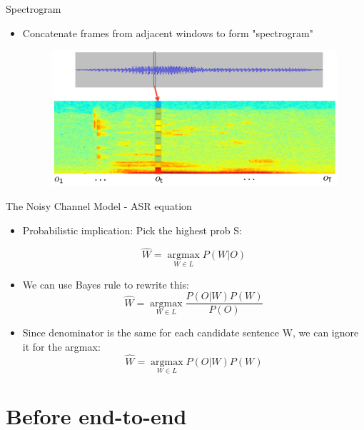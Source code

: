 \documentclass[10pt]{beamer}
\begin{document}
\begin{frame}[fragile]{Spectrogram}
\begin{itemize}
\item Concatenate frames from adjacent windows to form "spectrogram"
\begin{figure}
\includegraphics[width=\linewidth]{./images/page-18.png}
\end{figure}
\end{itemize}
\end{frame}

\begin{frame}[fragile]{The Noisy Channel Model - ASR equation}
\begin{itemize}
	\item Probabilistic implication: Pick the highest prob S:
	
	$$\hat{W} = \operatorname*{argmax}_{W \in L} P(W | O)$$
	\item We can use Bayes rule to rewrite this:
	$$\hat{W} = \operatorname*{argmax}_{W \in L} \frac{P(O | W)P(W)}{P(O)}$$
	
	\item Since denominator is the same for each candidate sentence W, we can ignore it for the argmax:
	$$\hat{W} = \operatorname*{argmax}_{W \in L} P(O | W)P(W)$$
	
\end{itemize}
\end{frame}



\section{Before end-to-end}
\end{document}
